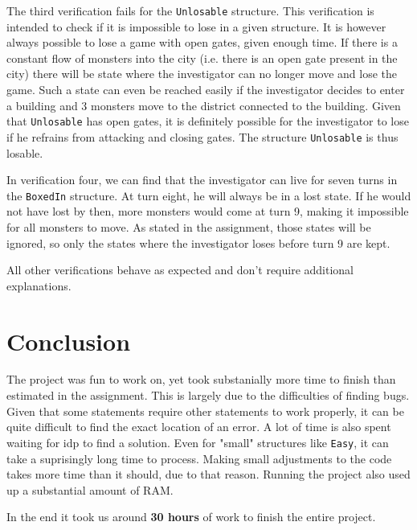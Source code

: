 \documentclass[12pt]{report}
\begin{document}
The third verification fails for the \texttt{Unlosable} structure. This verification is intended to check if it is impossible to lose in a given structure. It is however always possible to lose a game with open gates, given enough time. If there is a constant flow of monsters into the city (i.e. there is an open gate present in the city) there will be state where the investigator can no longer move and lose the game. Such a state can even be reached easily if the investigator decides to enter a building and 3 monsters move to the district connected to the building. Given that \texttt{Unlosable} has open gates, it is definitely possible for the investigator to lose if he refrains from attacking and closing gates. The structure \texttt{Unlosable} is thus losable.

In verification four, we can find that the investigator can live for seven turns in the \texttt{BoxedIn} structure. At turn eight, he will always be in a lost state. If he would not have lost by then, more monsters would come at turn 9, making it impossible for all monsters to move. As stated in the assignment, those states will be ignored, so only the states where the investigator loses before turn 9 are kept.

All other verifications behave as expected and don't require additional explanations.

\section*{Conclusion}
The project was fun to work on, yet took substanially more time to finish than estimated in the assignment. This is largely due to the difficulties of finding bugs. Given that some statements require other statements to work properly, it can be quite difficult to find the exact location of an error. A lot of time is also spent waiting for idp to find a solution. Even for "small" structures like \texttt{Easy}, it can take a suprisingly long time to process. Making small adjustments to the code takes more time than it should, due to that reason. Running the project also used up a substantial amount of RAM.


In the end it took us around \textbf{30 hours} of work to finish the entire project.
\end{document}
